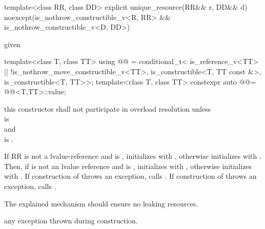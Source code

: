 \documentclass[ebook,11pt,article]{memoir}
\begin{document}
\begin{itemdecl}
    template<class RR, class DD>
    explicit unique_resource(RR&& r, DD&& d)
        noexcept(is_nothrow_constructible_v<R, RR> 
                && is_nothrow_constructible_v<D, DD>)
\end{itemdecl}

\begin{itemdescr}
\pnum
\remarks
given 
\begin{codeblock}
template<class T, class TT>
using @@ =
     conditional_t<
        is_reference_v<TT> || !is_nothrow_move_constructible_v<TT>,
        is_constructible<T, TT const &>,
        is_constructible<T, TT>>;
template<class T, class TT>
constexpr auto @@=
		@@<T,TT>::value;
\end{codeblock}
this constructor shall not participate in overload resolution unless
\\  is \\
and\\
 is .

\pnum
\effects If RR is not a lvalue-reference and  is , initializes  with , otherwise initializes  with . Then, if  is not an lvalue reference and  is , initializes   with , otherwise initializes  with . If construction of  throws an exception, calls .  If construction of  throws an exception, calls . 
\begin{note}
The explained mechanism should ensure no leaking resources.
\end{note}

\pnum
\throws any exception thrown during construction.
\end{itemdescr}
\end{document}
